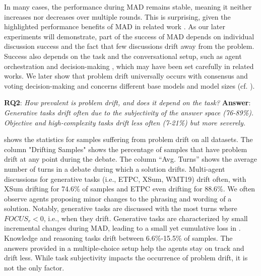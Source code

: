 In many cases, the performance during MAD remains stable, meaning it neither increases nor decreases over multiple rounds.
This is surprising, given the highlighted performance benefits of MAD in related work \citep{YinSCG23a, SchickDJP22a}.
As our later experiments will demonstrate, part of the success of MAD depends on individual discussion success and the fact that few discussions drift away from the problem.
Success also depends on the task and the conversational setup, such as agent orchestration and decision-making \citep{GuoCWC24a}, which may have been set carefully in related works.
We later show that problem drift universally occurs with consensus and voting decision-making and concerns different base models and model sizes (cf. ).

\noindent \textbf{RQ2}: \textit{How prevalent is problem drift, and does it depend on the task?} \textbf{Answer}: \textit{Generative tasks drift often due to the subjectivity of the answer space (76-89\%). 
Objective and high-complexity tasks drift less often (7-21\%) but more severely.}


 shows the statistics for samples suffering from problem drift on all datasets.
The column "Drifting Samples" shows the percentage of samples that have problem drift at any point during the debate.
The column ``Avg. Turns'' shows the average number of turns in a debate during which a solution drifts.
Multi-agent discussions for generative tasks (i.e., ETPC, XSum, WMT19) drift often, with XSum drifting for 74.6\% of samples and ETPC even drifting for 88.6\%.
We often observe agents proposing minor changes to the phrasing and wording of a solution.
Notably, generative tasks are discussed with the most turns where $FOCUS_r < 0$, i.e., when they drift.
Generative tasks are characterized by small incremental changes during MAD, leading to a small yet cumulative loss in \metric.
Knowledge and reasoning tasks drift between 6.6\%-15.5\% of samples.
The answers provided in a multiple-choice setup help the agents stay on track and drift less.
While task subjectivity impacts the occurrence of problem drift, it is not the only factor.

